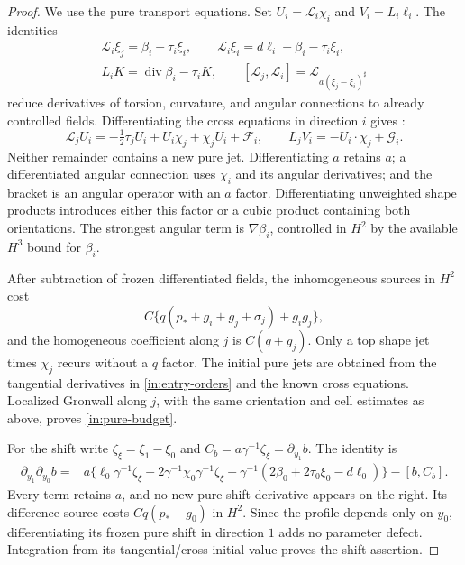 \begin{proof}
We use the pure transport equations.
Set $U_i=\mathscr L_i\chi_i$ and $V_i=L_i\ell_i$.
The identities
\begin{equation}\label{in:pure-identities}
\begin{gathered}
 \mathscr L_i\xi_j=\beta_i+\tau_i\xi_i,\qquad
 \mathscr L_i\xi_i=d\ell_i-\beta_i-\tau_i\xi_i,\\
 L_iK=\operatorname{div}\beta_i-\tau_iK,\qquad
 [\mathscr L_j,\mathscr L_i]
     =\mathcal L_{a(\xi_j-\xi_i)^\sharp}
\end{gathered}
\end{equation}
reduce derivatives of torsion, curvature, and angular connections to
already controlled fields. Differentiating the cross equations in
direction $i$ gives :
\begin{equation}\label{in:pure-top}
 \mathscr L_jU_i=-\tfrac12\tau_jU_i
                    +U_i\chi_j+\chi_jU_i+\mathcal F_i,
 \qquad
 L_jV_i=-U_i\mathbin{\cdot}\chi_j+\mathcal G_i.
\end{equation}
Neither remainder contains a new pure jet. Differentiating $a$
retains $a$; a differentiated angular connection uses $\chi_i$ and
its angular derivatives; and the bracket is an angular operator with
an $a$ factor. Differentiating unweighted shape products introduces
either this factor or a cubic product containing both orientations.
The strongest angular term is $\nabla\beta_i$, controlled in $H^2$
by the available $H^3$ bound for $\beta_i$.

After subtraction of frozen differentiated fields, the inhomogeneous
sources in $H^2$ cost
\[
 C\{q(p_*+g_i+g_j+\sigma_j)+g_i g_j\},
\]
and the homogeneous coefficient along $j$ is $C(q+g_j)$.
Only a top shape jet times $\chi_j$ recurs without a $q$ factor.
The initial pure jets are obtained from the tangential derivatives in
\eqref{in:entry-orders} and the known cross equations.
Localized Gronwall along $j$, with the same orientation and cell
estimates as above, proves \eqref{in:pure-budget}.

For the shift write $\zeta_\xi=\xi_1-\xi_0$ and
$C_b=a\gamma^{-1}\zeta_\xi=\partial_{y_1}b$.
The identity  is
\begin{equation}\label{in:pure-shift}
\begin{split}
 \partial_{y_1}\partial_{y_0}b
 ={}&a\{\ell_0\gamma^{-1}\zeta_\xi
       -2\gamma^{-1}\chi_0\gamma^{-1}\zeta_\xi
       +\gamma^{-1}(2\beta_0+2\tau_0\xi_0-d\ell_0)\}
       -[b,C_b].
\end{split}
\end{equation}
Every term retains $a$, and no new pure shift derivative appears on
the right. Its difference source costs $Cq(p_*+g_0)$ in $H^2$.
Since the profile depends only on $y_0$, differentiating its frozen
pure shift in direction $1$ adds no parameter defect. Integration
from its tangential/cross initial value proves the shift assertion.


\end{proof}
